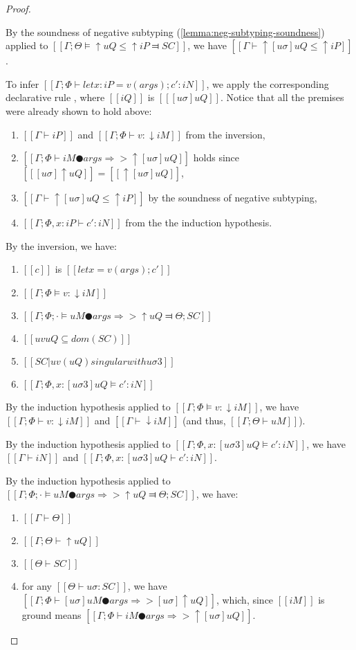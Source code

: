 \begin{proof}
\begin{caseof}
        By the soundness of negative subtyping (\cref{lemma:neg-subtyping-soundness})
        applied to $[[Γ; Θ ⊨ ↑uQ ≤ ↑iP ⫤ SC]]$, we have $[[Γ ⊢ ↑[uσ]uQ ≤ ↑iP]]$.

        To infer $[[Γ ; Φ ⊢ let x : iP = v(args); c' : iN ]]$,
        we apply the corresponding declarative rule , where
        $[[iQ]]$ is $[[ [uσ]uQ  ]]$. Notice that all the premises were already shown to
        hold above:
        \begin{enumerate}
            \item $[[Γ ⊢ iP]]$ and $[[Γ; Φ ⊢ v : ↓iM]]$ from the inversion,
            \item $[[Γ; Φ ⊢ iM ● args ⇒> ↑[uσ]uQ]]$ holds since $[[ [uσ]↑uQ ]] = [[ ↑[uσ]uQ ]]$,
            \item $[[Γ ⊢ ↑[uσ]uQ ≤ ↑iP]]$ by the soundness of negative subtyping,
            \item $[[Γ; Φ, x:iP ⊢ c' : iN]]$ from the the induction hypothesis.
        \end{enumerate}

        \item {}
        By the inversion, we have:
        \begin{enumerate}
            \item $[[c]]$ is $[[let x = v(args) ; c']]$
            \item $[[Γ; Φ ⊨ v : ↓iM]]$ 
            \item $[[Γ ; Φ ; · ⊨ uM ● args ⇒> ↑uQ ⫤ Θ; SC]]$
            \item $[[uv uQ ⊆ dom(SC)]]$
            \item $[[SC|uv(uQ) singular with uσ3]]$
            \item $[[Γ; Φ, x:[uσ3]uQ ⊨ c' : iN]]$
        \end{enumerate}

        By the induction hypothesis applied to $[[Γ; Φ ⊨ v : ↓iM]]$, we have    
        $[[Γ; Φ ⊢ v : ↓iM]]$ and $[[Γ ⊢ ↓iM]]$ (and thus, $[[Γ ; Θ  ⊢ uM]]$).
       
        By the induction hypothesis applied to $[[Γ; Φ, x:[uσ3]uQ ⊨ c' : iN]]$, we have
        $[[Γ ⊢ iN]]$ and $[[Γ; Φ, x:[uσ3]uQ ⊢ c' : iN]]$.

        By the induction hypothesis applied to 
        $[[Γ ; Φ ; · ⊨ uM ● args ⇒> ↑uQ ⫤ Θ; SC]]$, we have:
        \begin{enumerate}
            \item $[[Γ ⊢ Θ]]$
            \item $[[Γ; Θ ⊢ ↑uQ]]$
            \item $[[Θ ⊢ SC]]$
            \item for any $[[Θ ⊢ uσ : SC]]$, we have $[[ Γ ; Φ ⊢ [uσ]uM ● args ⇒> [uσ]↑uQ ]]$, 
                which, since  $[[iM]]$ is ground means $[[ Γ ; Φ ⊢ iM ● args ⇒> ↑[uσ]uQ]]$.
        \end{enumerate}


\end{caseof}
\end{proof}
